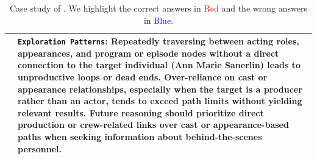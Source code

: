 \begin{table}[t]
\begin{tabular}{>{\centering\arraybackslash}m{2.5cm}|p{12.2cm}}
& \texttt{\textbf{Exploration Patterns}}: Repeatedly traversing between acting roles, appearances, and program or episode nodes without a direct connection to the target individual (Ann Marie Sanerlin) leads to unproductive loops or dead ends. Over-reliance on cast or appearance relationships, especially when the target is a producer rather than an actor, tends to exceed path limits without yielding relevant results. Future reasoning should prioritize direct production or crew-related links over cast or appearance-based paths when seeking information about behind-the-scenes personnel. \\
\bottomrule
\end{tabular}
\caption{Case study of \method{}. We highlight the correct answers in \textcolor{red}{Red} and the wrong answers in \textcolor{blue}{Blue}.}

\label{tab:case_study1}
\end{table}